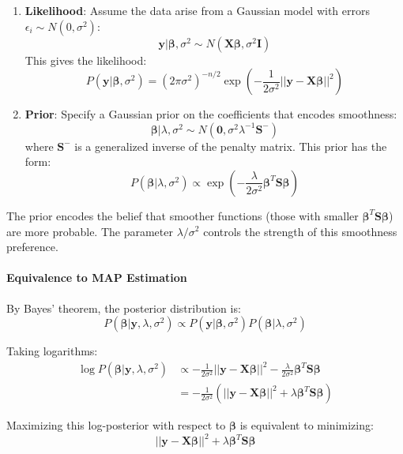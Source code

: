 \documentclass[11pt, a4paper]{article}
\begin{document}
\begin{enumerate}
\item \textbf{Likelihood}: Assume the data arise from a Gaussian model with errors $\epsilon_i \sim N(0, \sigma^2)$:
\[ \mathbf{y} | \boldsymbol{\beta}, \sigma^2 \sim N(\mathbf{X}\boldsymbol{\beta}, \sigma^2\mathbf{I}) \]
This gives the likelihood:
\[ P(\mathbf{y} | \boldsymbol{\beta}, \sigma^2) = (2\pi\sigma^2)^{-n/2} \exp\left(-\frac{1}{2\sigma^2}||\mathbf{y} - \mathbf{X}\boldsymbol{\beta}||^2\right) \]

\item \textbf{Prior}: Specify a Gaussian prior on the coefficients that encodes smoothness:
\[ \boldsymbol{\beta} | \lambda, \sigma^2 \sim N(\mathbf{0}, \sigma^2\lambda^{-1}\mathbf{S}^{-}) \]
where $\mathbf{S}^{-}$ is a generalized inverse of the penalty matrix. This prior has the form:
\[ P(\boldsymbol{\beta} | \lambda, \sigma^2) \propto \exp\left(-\frac{\lambda}{2\sigma^2}\boldsymbol{\beta}^T\mathbf{S}\boldsymbol{\beta}\right) \]
\end{enumerate}

The prior encodes the belief that smoother functions (those with smaller $\boldsymbol{\beta}^T\mathbf{S}\boldsymbol{\beta}$) are more probable. The parameter $\lambda/\sigma^2$ controls the strength of this smoothness preference.

\paragraph{Equivalence to MAP Estimation}
By Bayes' theorem, the posterior distribution is:
\[ P(\boldsymbol{\beta} | \mathbf{y}, \lambda, \sigma^2) \propto P(\mathbf{y} | \boldsymbol{\beta}, \sigma^2) P(\boldsymbol{\beta} | \lambda, \sigma^2) \]

Taking logarithms:
\begin{align}
\log P(\boldsymbol{\beta} | \mathbf{y}, \lambda, \sigma^2) &\propto -\frac{1}{2\sigma^2}||\mathbf{y} - \mathbf{X}\boldsymbol{\beta}||^2 - \frac{\lambda}{2\sigma^2}\boldsymbol{\beta}^T\mathbf{S}\boldsymbol{\beta} \\
&= -\frac{1}{2\sigma^2}\left(||\mathbf{y} - \mathbf{X}\boldsymbol{\beta}||^2 + \lambda\boldsymbol{\beta}^T\mathbf{S}\boldsymbol{\beta}\right)
\end{align}

Maximizing this log-posterior with respect to $\boldsymbol{\beta}$ is equivalent to minimizing:
\[ ||\mathbf{y} - \mathbf{X}\boldsymbol{\beta}||^2 + \lambda\boldsymbol{\beta}^T\mathbf{S}\boldsymbol{\beta} \]
\end{document}
